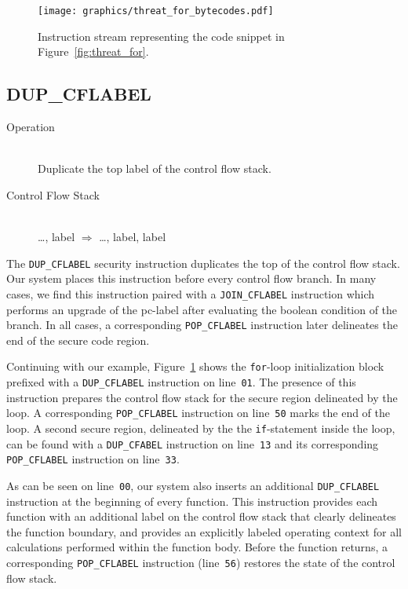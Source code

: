 \documentclass[preprint]{sigplanconf}
\begin{document}
\begin{figure}[ht]
  \centerline{\texttt{[image: graphics/threat\_for\_bytecodes.pdf]}}
  \caption{Instruction stream representing the code snippet in Figure~\ref{fig:threat_for}.} 
  \label{fig:threat_for_bytecodes}
\end{figure}

\subsection{DUP\_CFLABEL}

\begin{description}
\item[Operation] \hfill \\
 Duplicate the top label of the control flow stack.
\item[Control Flow Stack] \hfill \\
 \ldots, label $\Rightarrow$ \ldots, label, label
\end{description}

The \texttt{DUP\_CFLABEL} security instruction duplicates the top of the control flow stack.
Our system places this instruction before every control flow branch.
In many cases, we find this instruction paired with a \texttt{JOIN\_CFLABEL} instruction which performs an upgrade of the pc-label after evaluating the boolean condition of the branch.
In all cases, a corresponding \texttt{POP\_CFLABEL} instruction later delineates the end of the secure code region.

Continuing with our example, Figure~\ref{fig:threat_for_bytecodes} shows the \texttt{for}-loop initialization block prefixed with a \texttt{DUP\_CFLABEL} instruction on line~\texttt{01}.
The presence of this instruction prepares the control flow stack for the secure region delineated by the loop.
A corresponding \texttt{POP\_CFLABEL} instruction on line~\texttt{50} marks the end of the loop.
A second secure region, delineated by the the \texttt{if}-statement inside the loop, can be found with a \texttt{DUP\_CFABEL} instruction on line~\texttt{13} and its corresponding \texttt{POP\_CFLABEL} instruction on line~\texttt{33}.

As can be seen on line~\texttt{00}, our system also inserts an additional \texttt{DUP\_CFLABEL} instruction at the beginning of every function.
This instruction provides each function with an additional label on the control flow stack that clearly delineates the function boundary, and provides an explicitly labeled operating context for all calculations performed within the function body.
Before the function returns, a corresponding \texttt{POP\_CFLABEL} instruction (line~\texttt{56}) restores the state of the control flow stack.
\end{document}
